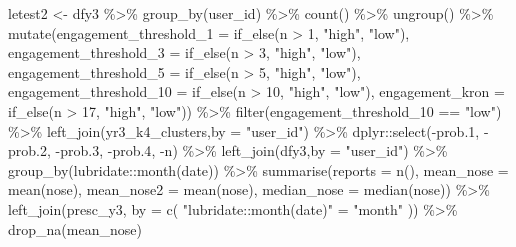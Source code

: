 \documentclass[
]{article}
\newenvironment{Shaded}{\begin{snugshade}}{\end{snugshade}}
\newcommand{\AttributeTok}[1]{\textcolor[rgb]{0.77,0.63,0.00}{#1}}
\newcommand{\DecValTok}[1]{\textcolor[rgb]{0.00,0.00,0.81}{#1}}
\newcommand{\FloatTok}[1]{\textcolor[rgb]{0.00,0.00,0.81}{#1}}
\newcommand{\FunctionTok}[1]{\textcolor[rgb]{0.00,0.00,0.00}{#1}}
\newcommand{\NormalTok}[1]{#1}
\newcommand{\OtherTok}[1]{\textcolor[rgb]{0.56,0.35,0.01}{#1}}
\newcommand{\SpecialCharTok}[1]{\textcolor[rgb]{0.00,0.00,0.00}{#1}}
\newcommand{\StringTok}[1]{\textcolor[rgb]{0.31,0.60,0.02}{#1}}
\begin{document}
\begin{Shaded}
\begin{Highlighting}[]
 
\NormalTok{ letest2 }\OtherTok{\textless{}{-}}\NormalTok{  dfy3 }\SpecialCharTok{\%\textgreater{}\%}
   \FunctionTok{group\_by}\NormalTok{(user\_id) }\SpecialCharTok{\%\textgreater{}\%}
   \FunctionTok{count}\NormalTok{() }\SpecialCharTok{\%\textgreater{}\%}
   \FunctionTok{ungroup}\NormalTok{() }\SpecialCharTok{\%\textgreater{}\%} 
   \FunctionTok{mutate}\NormalTok{(}\AttributeTok{engagement\_threshold\_1 =} \FunctionTok{if\_else}\NormalTok{(n }\SpecialCharTok{\textgreater{}} \DecValTok{1}\NormalTok{, }\StringTok{"high"}\NormalTok{, }\StringTok{"low"}\NormalTok{),}
          \AttributeTok{engagement\_threshold\_3 =} \FunctionTok{if\_else}\NormalTok{(n }\SpecialCharTok{\textgreater{}} \DecValTok{3}\NormalTok{, }\StringTok{"high"}\NormalTok{, }\StringTok{"low"}\NormalTok{),}
          \AttributeTok{engagement\_threshold\_5 =} \FunctionTok{if\_else}\NormalTok{(n }\SpecialCharTok{\textgreater{}} \DecValTok{5}\NormalTok{, }\StringTok{"high"}\NormalTok{, }\StringTok{"low"}\NormalTok{),}
          \AttributeTok{engagement\_threshold\_10 =} \FunctionTok{if\_else}\NormalTok{(n }\SpecialCharTok{\textgreater{}} \DecValTok{10}\NormalTok{, }\StringTok{"high"}\NormalTok{, }\StringTok{"low"}\NormalTok{),}
          \AttributeTok{engagement\_kron =} \FunctionTok{if\_else}\NormalTok{(n }\SpecialCharTok{\textgreater{}} \DecValTok{17}\NormalTok{, }\StringTok{"high"}\NormalTok{, }\StringTok{"low"}\NormalTok{)) }\SpecialCharTok{\%\textgreater{}\%} 
   \FunctionTok{filter}\NormalTok{(engagement\_threshold\_10 }\SpecialCharTok{==} \StringTok{"low"}\NormalTok{) }\SpecialCharTok{\%\textgreater{}\%} 
   \FunctionTok{left\_join}\NormalTok{(yr3\_k4\_clusters,}\AttributeTok{by =} \StringTok{"user\_id"}\NormalTok{) }\SpecialCharTok{\%\textgreater{}\%} 
\NormalTok{   dplyr}\SpecialCharTok{::}\FunctionTok{select}\NormalTok{(}\SpecialCharTok{{-}}\NormalTok{prob}\FloatTok{.1}\NormalTok{,}
                 \SpecialCharTok{{-}}\NormalTok{prob}\FloatTok{.2}\NormalTok{,}
                 \SpecialCharTok{{-}}\NormalTok{prob}\FloatTok{.3}\NormalTok{,}
                 \SpecialCharTok{{-}}\NormalTok{prob}\FloatTok{.4}\NormalTok{,}
                 \SpecialCharTok{{-}}\NormalTok{n) }\SpecialCharTok{\%\textgreater{}\%} 
   \FunctionTok{left\_join}\NormalTok{(dfy3,}\AttributeTok{by =} \StringTok{"user\_id"}\NormalTok{) }\SpecialCharTok{\%\textgreater{}\%}  
   \FunctionTok{group\_by}\NormalTok{(lubridate}\SpecialCharTok{::}\FunctionTok{month}\NormalTok{(date)) }\SpecialCharTok{\%\textgreater{}\%}
   \FunctionTok{summarise}\NormalTok{(}\AttributeTok{reports =} \FunctionTok{n}\NormalTok{(),}
             \AttributeTok{mean\_nose =} \FunctionTok{mean}\NormalTok{(nose),}
             \AttributeTok{mean\_nose2 =} \FunctionTok{mean}\NormalTok{(nose),}
             \AttributeTok{median\_nose =} \FunctionTok{median}\NormalTok{(nose)) }\SpecialCharTok{\%\textgreater{}\%}
   \FunctionTok{left\_join}\NormalTok{(presc\_y3, }\AttributeTok{by =} \FunctionTok{c}\NormalTok{( }\StringTok{"lubridate::month(date)"} \OtherTok{=} \StringTok{"month"}\NormalTok{ )) }\SpecialCharTok{\%\textgreater{}\%} 
   \FunctionTok{drop\_na}\NormalTok{(mean\_nose) }
 

\end{Highlighting}
\end{Shaded}
\end{document}
